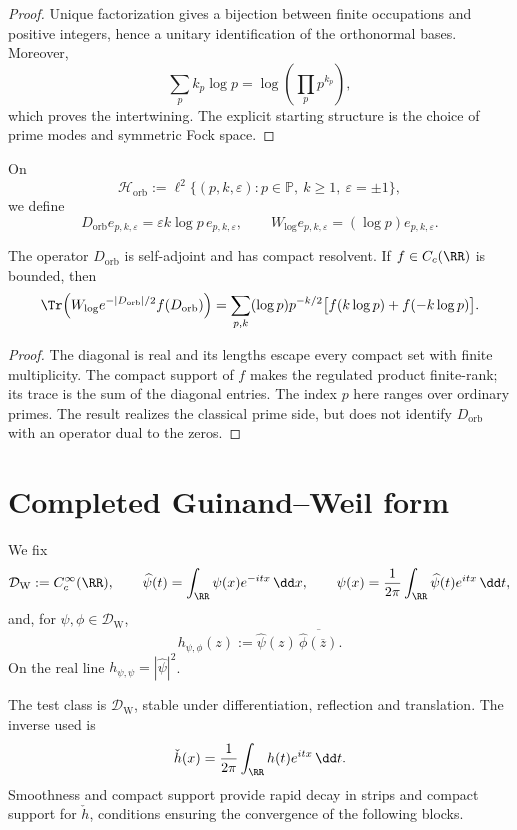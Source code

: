 \begin{proof}
Unique factorization gives a bijection between finite occupations and positive
integers, hence a unitary identification of the orthonormal bases.
Moreover,
\[
 \sum_pk_p\log p=\log\!\left(\prod_pp^{k_p}\right),
\]
which proves the intertwining. The explicit starting structure is the
choice of prime modes and symmetric Fock space.
\end{proof}

On
\[
 \mathcal H_{\mathrm{orb}}
 :=\ell^2\{(p,k,\varepsilon):
 p\in\mathbb P,\ k\ge1,\ \varepsilon=\pm1\},
\]
we define
\[
 D_{\mathrm{orb}}e_{p,k,\varepsilon}
 =\varepsilon k\log p\,e_{p,k,\varepsilon},
 \qquad
 W_{\log}e_{p,k,\varepsilon}
 =(\log p)e_{p,k,\varepsilon}.
\]

\begin{proposition}
\label{pf84:C09}
The operator \(D_{\mathrm{orb}}\) is self-adjoint and has compact resolvent. If
\(f\in C_c(\RR)\) is bounded, then
\[
 \Tr\!\left(
 W_{\log}e^{-|D_{\mathrm{orb}}|/2}f(D_{\mathrm{orb}})
 \right)
 =
 \sum_{p,k}(\log p)p^{-k/2}
 \bigl[f(k\log p)+f(-k\log p)\bigr].
\]
\end{proposition}

\begin{proof}
The diagonal is real and its lengths escape every compact set with
finite multiplicity. The compact support of \(f\) makes the regulated
product finite-rank; its trace is the sum of the diagonal entries.
The index \(p\) here ranges over ordinary primes. The result realizes the
classical prime side, but does not identify \(D_{\mathrm{orb}}\) with an operator
dual to the zeros.
\end{proof}

\section{Completed Guinand--Weil form}

We fix
\[
 \mathcal D_{\mathrm W}:=C_c^\infty(\RR),
 \qquad
 \widehat\psi(t)=\int_{\RR}\psi(x)e^{-itx}\,\dd x,
 \qquad
 \psi(x)=\frac1{2\pi}\int_{\RR}\widehat\psi(t)e^{itx}\,\dd t,
\]
and, for \(\psi,\phi\in\mathcal D_{\mathrm W}\),
\[
 h_{\psi,\phi}(z)
 :=\widehat\psi(z)\,
 \overline{\widehat\phi(\overline z)}.
\]
On the real line \(h_{\psi,\psi}=|\widehat\psi|^2\).

\begin{definition}
\label{pf84:E01}
The test class is \(\mathcal D_{\mathrm W}\), stable under differentiation,
reflection and translation. The inverse used is
\[
 \check h(x)=\frac1{2\pi}\int_{\RR}h(t)e^{itx}\,\dd t.
\]
Smoothness and compact support provide rapid decay in strips
and compact support for \(\check h\), conditions ensuring the
convergence of the following blocks.
\end{definition}

